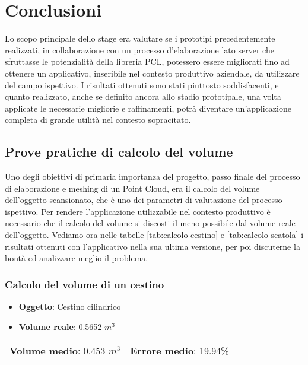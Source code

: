
\chapter{Conclusioni}
\label{cap:conclusioni}
Lo scopo principale dello stage era valutare se i prototipi precedentemente realizzati, in collaborazione con un processo d'elaborazione lato server che sfruttasse le potenzialità della libreria PCL, potessero essere migliorati fino ad ottenere un applicativo, inseribile nel contesto produttivo aziendale, da utilizzare del campo ispettivo. 
I risultati ottenuti sono stati piuttosto soddisfacenti, e quanto realizzato, anche se definito ancora allo stadio prototipale, una volta applicate le necessarie migliorie e raffinamenti, potrà diventare un'applicazione completa di grande utilità nel contesto sopracitato.

\section{Prove pratiche di calcolo del volume}
Uno degli obiettivi di primaria importanza del progetto, passo finale del processo di elaborazione e meshing di un Point Cloud, era il calcolo del volume dell'oggetto scansionato, che è uno dei parametri di valutazione del processo ispettivo.
Per rendere l'applicazione utilizzabile nel contesto produttivo è necessario che il calcolo del volume si discosti il meno possibile dal volume reale dell'oggetto. 
Vediamo ora nelle tabelle \ref{tab:calcolo-cestino} e \ref{tab:calcolo-scatola} i risultati ottenuti con l'applicativo nella sua ultima versione, per poi discuterne la bontà ed analizzare meglio il problema.
\subsection{Calcolo del volume di un cestino}
\begin{itemize}
\item \textbf{Oggetto}: Cestino cilindrico
\item \textbf{Volume reale}: 0.5652 $ m^3 $
\end{itemize}
\begin{tabular}{l r}
\textbf{Volume medio}: 0.453 $m^3$ & \hspace{115pt} \textbf{Errore medio}: 19.94\% \\
\end{tabular}
\newline

